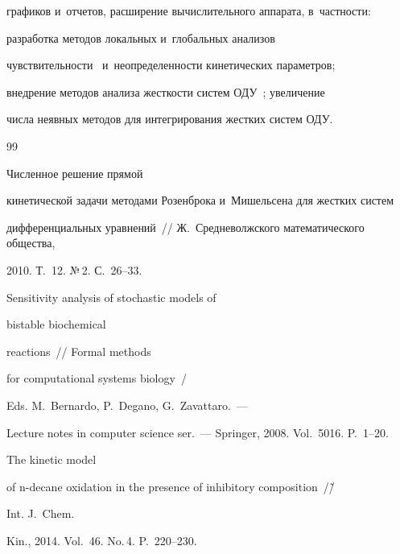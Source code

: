 графиков и~отчетов, расширение вы\-чис\-ли\-тель\-но\-го аппарата, в~част\-ности: 


разработка методов локальных и~глобальных анализов 


чувствительности~\cite{2-en} и~неопределенности кинетических параметров; 


внедрение методов анализа жесткости систем ОДУ~\cite{10-en}; увеличение 


числа неявных методов для интегрирования жестких систем ОДУ.


  


{\small\frenchspacing


{%




\begin{thebibliography}{99}




   Численное решение прямой 


кинетической задачи методами Розенброка и~Мишельсена для жестких систем 


дифференциальных уравнений~/\!\!/ Ж.~Средневолжского математического общества, 


2010. Т.~12. №\,2. С.~26--33.




   Sensitivity analysis of stochastic models of 


  bistable biochemical 


reactions~/\!\!/ Formal methods


for computational systems biology~/


Eds. M.~Bernardo, P.~Degano, G.~Zavattaro.~---


Lecture notes in computer science ser.~--- Springer, 2008. Vol.~5016. P.~1--20.




   The kinetic model 


of n-decane oxidation in the presence of inhibitory composition~/\!\~/ 


Int. J.~Chem. 


Kin., 2014. Vol.~46. No.\,4. P.~220--230.







\end{thebibliography}}}

